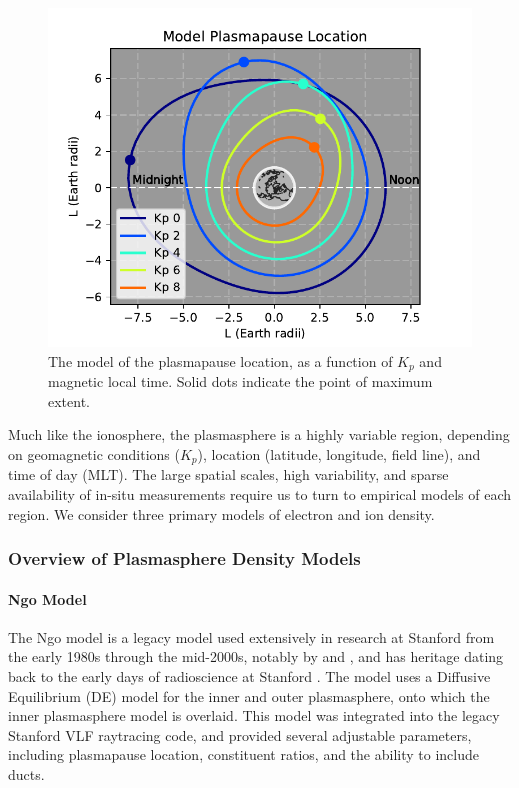 \begin{figure}[h]
\begin{center}
\includegraphics{figures/plasmapause}
\caption[Model of plasmapause location]{The \cite{Gallagher1999} model of the plasmapause location, as a function of $K_p$ and magnetic local time. Solid dots indicate the point of maximum extent.}
\label{fig:plasmapause}
\end{center}
\end{figure}


Much like the ionosphere, the plasmasphere is a highly variable region, depending on geomagnetic conditions ($K_p$), location (latitude, longitude, field line), and time of day (MLT). The large spatial scales, high variability, and sparse availability of in-situ measurements require us to turn to empirical models of each region. We consider three primary models of electron and ion density.

\subsubsection{Overview of Plasmasphere Density Models}
\label{section:plasmasphere_density_models}
\paragraph{Ngo Model}

The Ngo model is a legacy model used extensively in research at Stanford from the early 1980s through the mid-2000s, notably by \cite{Lauben1998} and \cite{Bortnik2005}, and has heritage dating back to the early days of radioscience at Stanford \citep{Kimura1966}. The model uses a Diffusive Equilibrium (DE) \citep{Angerami1964} model for the inner and outer plasmasphere, onto which the \cite{Carpenter1992} inner plasmasphere model is overlaid. This model was integrated into the legacy Stanford VLF raytracing code, and provided several adjustable parameters, including plasmapause location, constituent ratios, and the ability to include ducts.

